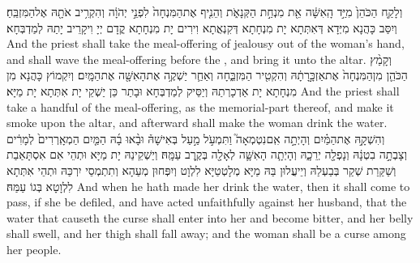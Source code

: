 {וְלָקַ֤ח הַכֹּהֵן֙ מִיַּ֣ד הָֽאִשָּׁ֔ה אֵ֖ת מִנְחַ֣ת הַקְּנָאֹ֑ת וְהֵנִ֤יף אֶת\maqqaf הַמִּנְחָה֙ לִפְנֵ֣י יְהֹוָ֔ה וְהִקְרִ֥יב אֹתָ֖הּ אֶל\maqqaf הַמִּזְבֵּֽחַ׃}
{וְיִסַּב כָּהֲנָא מִיְּדָא דְּאִתְּתָא יָת מִנְחָתָא דְּקִנְאֲתָא וִירִים יָת מִנְחָתָא קֳדָם יְיָ וִיקָרֵיב יָתַהּ לְמַדְבְּחָא׃}
{And the priest shall take the meal-offering of jealousy out of the woman’s hand, and shall wave the meal-offering before the \lord, and bring it unto the altar.}{}
{וְקָמַ֨ץ הַכֹּהֵ֤ן מִן\maqqaf הַמִּנְחָה֙ אֶת\maqqaf אַזְכָּ֣רָתָ֔הּ וְהִקְטִ֖יר הַמִּזְבֵּ֑חָה וְאַחַ֛ר יַשְׁקֶ֥ה אֶת\maqqaf הָאִשָּׁ֖ה אֶת\maqqaf הַמָּֽיִם׃}
{וְיִקְמוֹץ כָּהֲנָא מִן מִנְחָתָא יָת אַדְכָרְתַהּ וְיַסֵּיק לְמַדְבְּחָא וּבָתַר כֵּן יַשְׁקֵי יָת אִתְּתָא יָת מַיָּא׃}
{And the priest shall take a handful of the meal-offering, as the memorial-part thereof, and make it smoke upon the altar, and afterward shall make the woman drink the water.}{}
{וְהִשְׁקָ֣הּ אֶת\maqqaf הַמַּ֗יִם וְהָיְתָ֣ה אִֽם\maqqaf נִטְמְאָה֮ וַתִּמְעֹ֣ל מַ֣עַל בְּאִישָׁהּ֒ וּבָ֨אוּ בָ֜הּ הַמַּ֤יִם הַמְאָֽרְרִים֙ לְמָרִ֔ים וְצָבְתָ֣ה בִטְנָ֔הּ וְנָפְלָ֖ה יְרֵכָ֑הּ וְהָיְתָ֧ה הָאִשָּׁ֛ה לְאָלָ֖ה בְּקֶ֥רֶב עַמָּֽהּ׃}
{וְיַשְׁקֵינַהּ יָת מַיָּא וּתְהֵי אִם אִסְתָּאַבַת וְשַׁקַּרַת שְׁקַר בְּבַעְלַהּ וְיֵיעֲלוּן בַּהּ מַיָּא מְלָטְטַיָּא לִלְוָט וְיִפְּחוּן מְעַהָא וְתִתְמְסֵי יִרְכַּהּ וּתְהֵי אִתְּתָא לִלְוָטָא בְּגוֹ עַמַּהּ׃}
{And when he hath made her drink the water, then it shall come to pass, if she be defiled, and have acted unfaithfully against her husband, that the water that causeth the curse shall enter into her and become bitter, and her belly shall swell, and her thigh shall fall away; and the woman shall be a curse among her people.}{}
